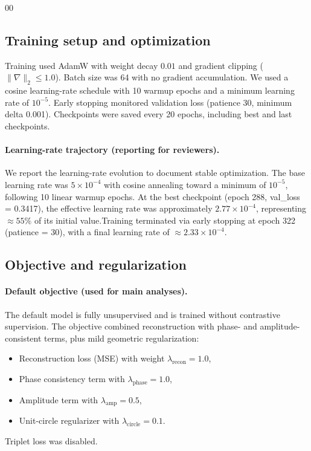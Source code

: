 \documentclass[5p,twocolumn,authoryear]{elsarticle}
\begin{document}
\begin{thebibliography}{00}
\subsection{Training setup and optimization}
\label{app:training}
Training used AdamW with weight decay $0.01$ and gradient clipping ($\|\nabla\|_2 \le 1.0$). Batch size was 64 with no gradient accumulation. We used a cosine learning-rate schedule with 10 warmup epochs and a minimum learning rate of $10^{-5}$. Early stopping monitored validation loss (patience 30, minimum delta 0.001). Checkpoints were saved every 20 epochs, including best and last checkpoints.

\paragraph{Learning-rate trajectory (reporting for reviewers).}
We report the learning-rate evolution to document stable optimization. The base learning rate was $5\times 10^{-4}$ with cosine annealing toward a minimum of $10^{-5}$, following 10 linear warmup epochs. At the best checkpoint (epoch 288, val\_loss = 0.3417), the effective learning rate was approximately $2.77\times 10^{-4}$, representing $\approx 55\%$ of its initial value.Training terminated via early stopping at epoch 322 (patience = 30), with a final learning rate of $\approx 2.33\times 10^{-4}$.

\subsection{Objective and regularization}
\label{app:loss}
\paragraph{Default objective (used for main analyses).}
The default model is fully unsupervised and is trained without contrastive supervision. The objective combined reconstruction with phase- and amplitude-consistent terms, plus mild geometric regularization:
\begin{itemize}
    \item Reconstruction loss (MSE) with weight $\lambda_{\mathrm{recon}}=1.0$,
    \item Phase consistency term with $\lambda_{\mathrm{phase}}=1.0$,
    \item Amplitude term with $\lambda_{\mathrm{amp}}=0.5$,
    \item Unit-circle regularizer with $\lambda_{\mathrm{circle}}=0.1$.
\end{itemize}
Triplet loss was disabled.


\end{thebibliography}
\end{document}
